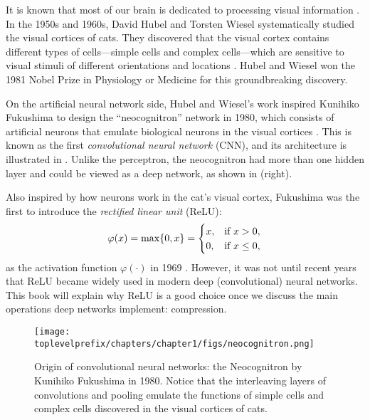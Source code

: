 \documentclass[../../book-main.tex]{subfiles}
\begin{document}
It is known that most of our brain is dedicated to processing visual information \cite{PalmerS1999}. In the 1950s and 1960s, David Hubel and Torsten Wiesel systematically studied the visual cortices of cats. They discovered that the visual cortex contains different types of cells---simple cells and complex cells---which are sensitive to visual stimuli of different orientations and locations \cite{Hubel-Wiesel-1959}. Hubel and Wiesel won the 1981 Nobel Prize in Physiology or Medicine for this groundbreaking discovery.

On the artificial neural network side, Hubel and Wiesel's work inspired Kunihiko Fukushima to design the ``neocognitron'' network in 1980, which consists of artificial neurons that emulate biological neurons in the visual cortices \cite{Fukushima1980NeocognitronAS}. This is known as the first \textit{convolutional neural network} (CNN), and its architecture is illustrated in . Unlike the perceptron, the neocognitron had more than one hidden layer and could be viewed as a deep network, as shown in  (right).

Also inspired by how neurons work in the cat's visual cortex, Fukushima was the first to introduce the \textit{rectified linear unit} (ReLU):
\begin{equation}
    \varphi(x) = \max\{0, x\} = \begin{cases}x, & \text{if } x > 0, \\ 0, & \text{if } x \leq 0,\end{cases}
\end{equation}
as the activation function $\varphi(\cdot)$ in 1969 \cite{Fukushima-1969}. However, it was not until recent years that ReLU became widely used in modern deep (convolutional) neural networks. This book will explain why ReLU is a good choice once we discuss the main operations deep networks implement: compression.

\begin{figure}
    \centering
    \texttt{[image: \\toplevelprefix/chapters/chapter1/figs/neocognitron.png]}
    \caption{Origin of convolutional neural networks: the Neocognitron by Kunihiko Fukushima in 1980. Notice that the interleaving layers of convolutions and pooling emulate the functions of simple cells and complex cells discovered in the visual cortices of cats.}
    \label{fig:neocognitron}
\end{figure}
\end{document}
